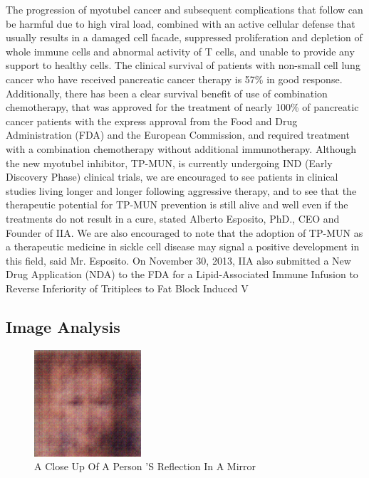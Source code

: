 \documentclass{article}%
\begin{document}
The progression of myotubel cancer and subsequent complications that follow can be harmful due to high viral load, combined with an active cellular defense that usually results in a damaged cell facade, suppressed proliferation and depletion of whole immune cells and abnormal activity of T cells, and unable to provide any support to healthy cells.\newline%
The clinical survival of patients with non{-}small cell lung cancer who have received pancreatic cancer therapy is 57\% in good response. Additionally, there has been a clear survival benefit of use of combination chemotherapy, that was approved for the treatment of nearly 100\% of pancreatic cancer patients with the express approval from the Food and Drug Administration (FDA) and the European Commission, and required treatment with a combination chemotherapy without additional immunotherapy.\newline%
Although the new myotubel inhibitor, TP{-}MUN, is currently undergoing IND (Early Discovery Phase) clinical trials, we are encouraged to see patients in clinical studies living longer and longer following aggressive therapy, and to see that the therapeutic potential for TP{-}MUN prevention is still alive and well even if the treatments do not result in a cure, stated Alberto Esposito, PhD., CEO and Founder of IIA.\newline%
We are also encouraged to note that the adoption of TP{-}MUN as a therapeutic medicine in sickle cell disease may signal a positive development in this field, said Mr. Esposito.\newline%
On November 30, 2013, IIA also submitted a New Drug Application (NDA) to the FDA for a Lipid{-}Associated Immune Infusion to Reverse Inferiority of Tritiplees to Fat Block Induced V

%
\subsection{Image Analysis}%
\label{subsec:ImageAnalysis}%


\begin{figure}[h!]%
\centering%
\includegraphics[width=150px]{500_fake_images/samples_5_57.png}%
\caption{A Close Up Of A Person 'S Reflection In A Mirror}%
\end{figure}

%
\end{document}
